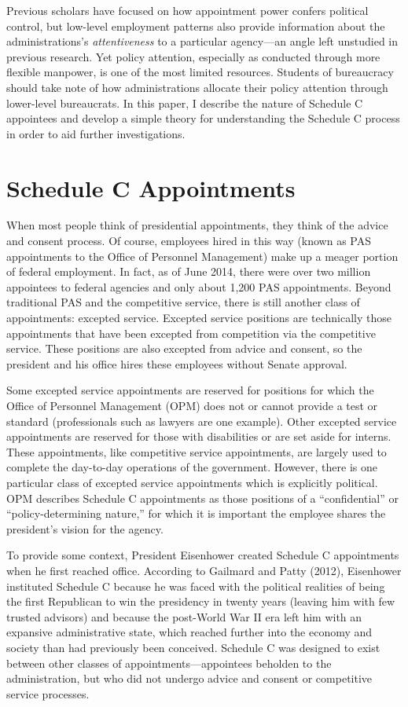 \documentclass[12pt]{article}
\begin{document}
Previous scholars have focused on how appointment power confers political control, but low-level employment patterns also provide information about the administrations's \textit{attentiveness} to a particular agency---an angle left unstudied in previous research. Yet policy attention, especially as conducted through more flexible manpower, is one of the most limited resources. Students of bureaucracy should take note of how administrations allocate their policy attention through lower-level bureaucrats. In this paper, I describe the nature of Schedule C appointees and develop a simple theory for understanding the Schedule C process in order to aid further investigations.

\section{Schedule C Appointments}


When most people think of presidential appointments, they think of the advice and consent process. Of course, employees hired in this way (known as PAS appointments to the Office of Personnel Management) make up a meager portion of federal employment. In fact, as of June 2014, there were over two million appointees to federal agencies and only about 1,200 PAS appointments. Beyond traditional PAS and the competitive service, there is still another class of appointments: excepted service. Excepted service positions are technically those appointments that have been excepted from competition via the competitive service. These positions are also excepted from advice and consent, so the president and his office hires these employees without Senate approval.

Some excepted service appointments are reserved for positions for which the Office of Personnel Management (OPM) does not or cannot provide a test or standard (professionals such as lawyers are one example). Other excepted service appointments are reserved for those with disabilities or are set aside for interns. These appointments, like competitive service appointments, are largely used to complete the day-to-day operations of the government. However, there is one particular class of excepted service appointments which is explicitly political. OPM describes Schedule C appointments as those positions of a ``confidential'' or ``policy-determining nature,'' for which it is important the employee shares the president's vision for the agency. 

To provide some context, President Eisenhower created Schedule C appointments when he first reached office. According to Gailmard and Patty (2012), Eisenhower instituted Schedule C because he was faced with the political realities of being the first Republican to win the presidency in twenty years (leaving him with few trusted advisors) and because the post-World War II era left him with an expansive administrative state, which reached further into the economy and society than had previously been conceived. Schedule C was designed to exist between other classes of appointments---appointees beholden to the administration, but who did not undergo advice and consent or competitive service processes.  
\end{document}
